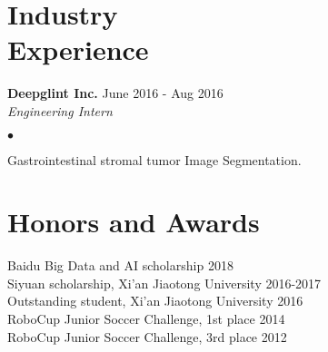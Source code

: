 \documentclass[margin,line]{res}
\newenvironment{list2}{
  \begin{list}{$\bullet$}{%
      \setlength{\itemsep}{0in}
      \setlength{\parsep}{0in} \setlength{\parskip}{0in}
      \setlength{\topsep}{0in} \setlength{\partopsep}{0in} 
      \setlength{\leftmargin}{0.2in}}}{\end{list}}
\begin{document}
\begin{resume}
\section{\sc Industry \\Experience}
{\bf Deepglint Inc.} \hfill {June 2016 - Aug 2016}\\%

\vspace{-.3in}
{\em Engineering Intern} %
\begin{list2}
\item Gastrointestinal stromal tumor Image Segmentation.
\end{list2}



\section{\sc Honors and Awards} 
Baidu Big Data and AI scholarship \hfill 2018\\
Siyuan scholarship, Xi'an Jiaotong University \hfill 2016-2017\\
Outstanding student, Xi'an Jiaotong University \hfill 2016 \\
RoboCup Junior Soccer Challenge, 1st place \hfill 2014\\
RoboCup Junior Soccer Challenge, 3rd place \hfill 2012\\




\end{resume}
\end{document}
